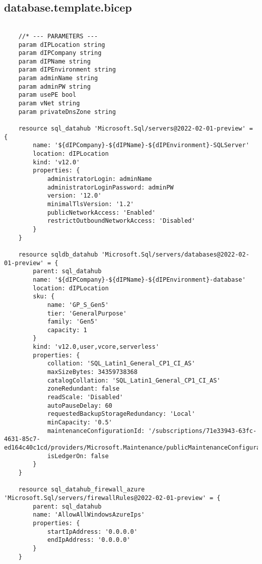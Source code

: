 \documentclass[dutch,dit,thesis]{hogentreport}
\begin{document}
\subsection{database.template.bicep}
\label{sec:database.template.bicep}
\begin{lstlisting}

    //* --- PARAMETERS ---
    param dIPLocation string
    param dIPCompany string
    param dIPName string
    param dIPEnvironment string
    param adminName string
    param adminPW string
    param usePE bool
    param vNet string
    param privateDnsZone string

    resource sql_datahub 'Microsoft.Sql/servers@2022-02-01-preview' = {
        name: '${dIPCompany}-${dIPName}-${dIPEnvironment}-SQLServer'
        location: dIPLocation
        kind: 'v12.0'
        properties: {
            administratorLogin: adminName
            administratorLoginPassword: adminPW
            version: '12.0'
            minimalTlsVersion: '1.2'
            publicNetworkAccess: 'Enabled'
            restrictOutboundNetworkAccess: 'Disabled'
        }
    }

    resource sqldb_datahub 'Microsoft.Sql/servers/databases@2022-02-01-preview' = {
        parent: sql_datahub
        name: '${dIPCompany}-${dIPName}-${dIPEnvironment}-database'
        location: dIPLocation
        sku: {
            name: 'GP_S_Gen5'
            tier: 'GeneralPurpose'
            family: 'Gen5'
            capacity: 1
        }
        kind: 'v12.0,user,vcore,serverless'
        properties: {
            collation: 'SQL_Latin1_General_CP1_CI_AS'
            maxSizeBytes: 34359738368
            catalogCollation: 'SQL_Latin1_General_CP1_CI_AS'
            zoneRedundant: false
            readScale: 'Disabled'
            autoPauseDelay: 60
            requestedBackupStorageRedundancy: 'Local'
            minCapacity: '0.5'
            maintenanceConfigurationId: '/subscriptions/71e33943-63fc-4631-85c7-ed164c40c1cd/providers/Microsoft.Maintenance/publicMaintenanceConfigurations/SQL_Default'
            isLedgerOn: false
        }
    }

    resource sql_datahub_firewall_azure 'Microsoft.Sql/servers/firewallRules@2022-02-01-preview' = {
        parent: sql_datahub
        name: 'AllowAllWindowsAzureIps'
        properties: {
            startIpAddress: '0.0.0.0'
            endIpAddress: '0.0.0.0'
        }
    }


\end{lstlisting}
\end{document}
